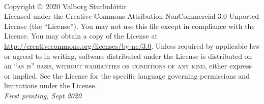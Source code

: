 \documentclass[11pt,fleqn]{book} %
\begin{document}

\begingroup
\thispagestyle{empty} %
\vfill
\endgroup


\newpage
~\vfill
\thispagestyle{empty}

\noindent Copyright \copyright\ 2020 Valborg Sturludóttir\\ %



\noindent Licensed under the Creative Commons Attribution-NonCommercial 3.0 Unported License (the ``License''). You may not use this file except in compliance with the License. You may obtain a copy of the License at \url{http://creativecommons.org/licenses/by-nc/3.0}. Unless required by applicable law or agreed to in writing, software distributed under the License is distributed on an \textsc{``as is'' basis, without warranties or conditions of any kind}, either express or implied. See the License for the specific language governing permissions and limitations under the License.\\ %

\noindent \textit{First printing, Sept 2020} %
\end{document}
